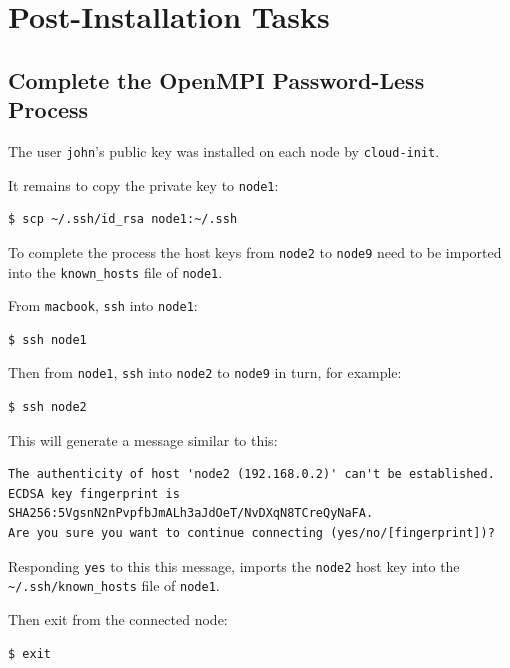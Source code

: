 \documentclass{report}
\begin{document}
%
%
\section{Post-Installation Tasks}


%
%
\subsection{Complete the OpenMPI Password-Less Process}

The user \verb|john|'s public key was installed on each node by \verb|cloud-init|.

It remains to copy the private key to \verb|node1|:

\lstset{style=type}
\begin{lstlisting}
$ scp ~/.ssh/id_rsa node1:~/.ssh
\end{lstlisting}

To complete the process the host keys from \verb|node2| to \verb|node9| need to be imported into the \verb|known_hosts| file of \verb|node1|.

From \verb|macbook|, \verb|ssh| into \verb|node1|:

\lstset{style=type}
\begin{lstlisting}[]
$ ssh node1
\end{lstlisting}

Then from \verb|node1|, \verb|ssh| into \verb|node2| to \verb|node9| in turn, for example:

\lstset{style=type}
\begin{lstlisting}[]
$ ssh node2
\end{lstlisting}


This will generate a message similar to this:

\lstset{style=type}
\begin{lstlisting}[]
The authenticity of host 'node2 (192.168.0.2)' can't be established.
ECDSA key fingerprint is SHA256:5VgsnN2nPvpfbJmALh3aJdOeT/NvDXqN8TCreQyNaFA.
Are you sure you want to continue connecting (yes/no/[fingerprint])?
\end{lstlisting}

Responding \verb|yes| to this this message, imports the \verb|node2| host key into the \verb|~/.ssh/known_hosts| file of \verb|node1|.

Then exit from the connected node:

\lstset{style=type}
\begin{lstlisting}[]
$ exit
\end{lstlisting}
\end{document}
